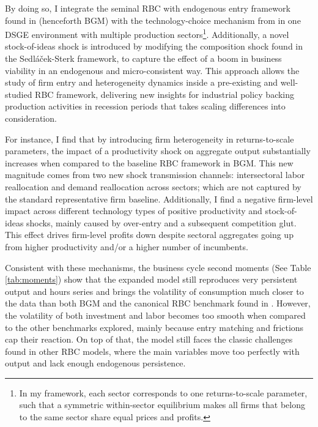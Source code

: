 \documentclass[a4paper,12pt]{article} %
\numberwithin{equation}{section} %
\numberwithin{figure}{section}
\numberwithin{table}{section}
\begin{document}
By doing so, I integrate the seminal RBC with endogenous entry framework found in \textcite{bilbiie2012endogenous} (henceforth BGM) with the technology-choice mechanism from
\textcite{sedlavcek2017growth} in one DSGE environment with multiple production sectors\footnote{In my framework, each sector corresponds to one 
returns-to-scale parameter, such that a symmetric within-sector equilibrium makes all firms that belong to the same sector share equal prices and profits.}. 
Additionally, a novel stock-of-ideas shock is introduced by modifying the composition shock found in the 
Sedláček-Sterk framework, to capture the effect of a boom in business viability in an endogenous and micro-consistent way. This approach allows the study of
firm entry and heterogeneity dynamics inside a pre-existing and well-studied RBC framework, delivering new insights for industrial policy backing 
production activities in recession periods that takes scaling differences into consideration.

For instance, I find that by introducing firm heterogeneity in returns-to-scale parameters, the impact of a productivity shock on aggregate output 
substantially increases when compared to the baseline RBC framework in BGM. This new magnitude comes from two new shock transmission channels: intersectoral 
labor reallocation and demand reallocation across sectors; which are not captured by the standard representative firm baseline. Additionally,
I find a negative firm-level impact across different technology types of positive productivity and stock-of-ideas shocks, mainly caused by over-entry
and a subsequent competition glut. This effect drives firm-level profits down despite sectoral aggregates going up from higher productivity and/or 
a higher number of incumbents.

Consistent with these mechanisms, the business cycle second moments (See Table \ref{tab:moments}) show that the expanded model still reproduces very 
persistent output and hours series and brings the volatility of consumption much closer to the data than both BGM 
and the canonical RBC benchmark found in \textcite{king1999resuscitating}. However, the volatility of both investment and labor becomes
too smooth when compared to the other benchmarks explored, mainly because entry matching and frictions cap their reaction. On top of that, the 
model still faces the classic challenges found in other RBC models, where the main variables move too perfectly with output and lack enough
endogenous persistence.
\end{document}
